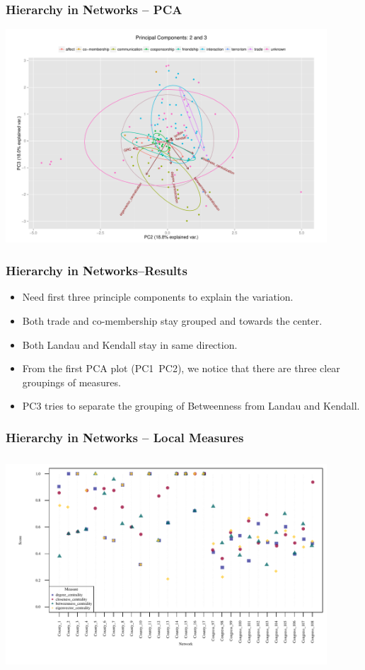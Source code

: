 \documentclass{beamer}
\newenvironment{changemargin}[2]{%
	\begin{list}{}{%
			\setlength{\topsep}{0pt}%
			\setlength{\leftmargin}{#1}%
			\setlength{\rightmargin}{#2}%
			\setlength{\listparindent}{\parindent}%
			\setlength{\itemindent}{\parindent}%
			\setlength{\parsep}{\parskip}%
		}%
		\item[]}{\end{list}}
\begin{document}
\begin{frame}\frametitle{Hierarchy in Networks -- PCA}
	\begin{changemargin}{-2cm}{ -2cm}
		\centering
		\includegraphics[width=12cm, height=8cm]{images/Observed_PCA_Components2_3.pdf}
	\end{changemargin}
\end{frame}

\begin{frame}\frametitle{Hierarchy in Networks--Results}
	\begin{itemize}
		\item Need first three principle components to explain the variation.
		\item Both trade and co-membership stay grouped and towards the center. 
		\item Both Landau and Kendall stay in same direction.
		\item From the first PCA plot (PC1~PC2), we notice that there are three clear groupings of measures.
		\item PC3 tries to separate the grouping of Betweenness from Landau and Kendall. 
	\end{itemize}
\end{frame}

\begin{frame}\frametitle{Hierarchy in Networks -- Local Measures}
	\begin{changemargin}{-2cm}{ -2cm}
		\centering
		\includegraphics[width=12cm, height=8cm]{images/Measure_Scores.pdf}
	\end{changemargin}
\end{frame}
\end{document}
